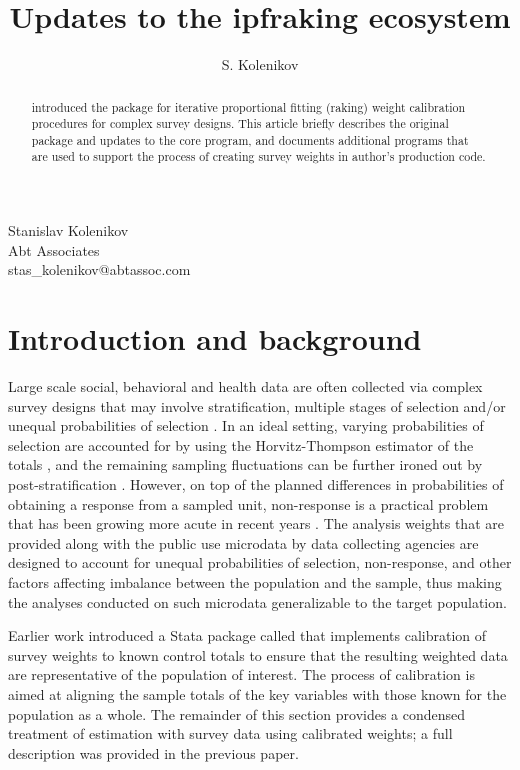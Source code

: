 \author{S. Kolenikov}{%
  Stanislav Kolenikov\\Abt Associates\\stas\_kolenikov@abtassoc.com
}
\title[Raking survey data: updates]{Updates to the ipfraking ecosystem}
\maketitle

\begin{abstract}
\citet{kolenikov:2014} introduced the package 
for iterative proportional fitting (raking) weight calibration procedures
for complex survey designs.
This article briefly describes the original package and updates to the core program,
and documents additional programs that are used to support the process of creating
survey weights in author's production code.

\end{abstract}

\section{Introduction and background}

Large scale social, behavioral and health data are often collected
via complex survey designs that may involve stratification,
multiple stages of selection and/or unequal probabilities of selection
\citep{korn:graubard:1995,korn:graubard:1999}.
In an ideal setting, varying probabilities of selection are
accounted for by using the Horvitz-Thompson estimator of the totals
\citep{horvitz:thompson:1952,thompson:1997}, and the remaining
sampling fluctuations can be further ironed out by
post-stratification \citep{holt:smith:1979}.
However, on top of the planned differences in probabilities of obtaining
a response from a sampled unit, non-response is a practical problem
that has been growing more acute in recent years
\citep{groves:dillman:eltinge:little:2001,pew:2012}.
The analysis weights that are provided along with the public use
microdata by data collecting agencies are designed to account
for unequal probabilities of selection, non-response, and other factors
affecting imbalance between the population and the sample, thus making
the analyses conducted on such microdata generalizable to the target population.

Earlier work \citep{kolenikov:2014} introduced a Stata package
called  that implements
calibration of survey weights to known control totals to ensure
that the resulting weighted data are representative of the population
of interest. The process of calibration is aimed at aligning the sample totals
of the key variables with those known for the population as a whole.
The remainder of this section provides a condensed treatment of estimation
with survey data using calibrated weights; a full description was provided
in the previous paper.

